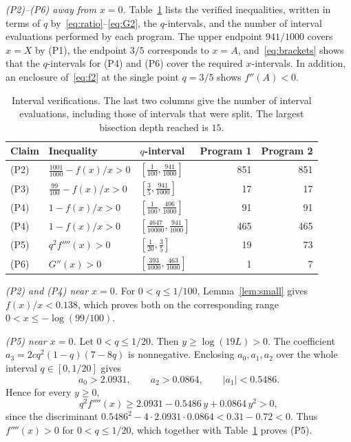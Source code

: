 \documentclass{amsart}
\numberwithin{equation}{section}
\numberwithin{table}{section}
\theoremstyle{definition}
\theoremstyle{remark}
\begin{document}
\emph{(P2)--(P6) away from $x=0$.} Table~\ref{tab:cover} lists the verified inequalities, written in terms of $q$ by~\eqref{eq:ratio}--\eqref{eq:G2}, the $q$-intervals, and the number of interval evaluations performed by each program. The upper endpoint $941/1000$ covers $x=X$ by (P1), the endpoint $3/5$ corresponds to $x=A$, and~\eqref{eq:brackets} shows that the $q$-intervals for (P4) and (P6) cover the required $x$-intervals. In addition, an enclosure of~\eqref{eq:f2} at the single point $q=3/5$ shows $f''(A)<0$.

\begin{table}[ht]
\caption{Interval verifications. The last two columns give the number of interval evaluations, including those of intervals that were split. The largest bisection depth reached is $15$.}
\label{tab:cover}
\centering
\begin{tabular}{@{}lllrr@{}}
\toprule
Claim & Inequality & $q$-interval & Program 1 & Program 2\\
\midrule
(P2) & $\frac{1001}{1000}-f(x)/x>0$ & $[\frac1{100},\frac{941}{1000}]$ & 851 & 851\\[2pt]
(P3) & $\frac{99}{100}-f(x)/x>0$ & $[\frac35,\frac{941}{1000}]$ & 17 & 17\\[2pt]
(P4) & $1-f(x)/x>0$ & $[\frac1{100},\frac{406}{1000}]$ & 91 & 91\\[2pt]
(P4) & $1-f(x)/x>0$ & $[\frac{4647}{10000},\frac{941}{1000}]$ & 465 & 465\\[2pt]
(P5) & $q^2f''''(x)>0$ & $[\frac1{20},\frac35]$ & 19 & 73\\[2pt]
(P6) & $G''(x)>0$ & $[\frac{393}{1000},\frac{463}{1000}]$ & 1 & 7\\
\bottomrule
\end{tabular}
\end{table}

\emph{(P2) and (P4) near $x=0$.} For $0<q\le1/100$, Lemma~\ref{lem:small} gives $f(x)/x<0.138$, which proves both on the corresponding range $0<x\le-\log(99/100)$.

\emph{(P5) near $x=0$.} Let $0<q\le1/20$. Then $y\ge\log(19L)>0$. The coefficient $a_3=2cq^2(1-q)(7-8q)$ is nonnegative. Enclosing $a_0,a_1,a_2$ over the whole interval $q\in[0,1/20]$ gives
\[
a_0>2.0931,\qquad a_2>0.0864,\qquad |a_1|<0.5486 .
\]
Hence for every $y\ge0$,
\[
q^2f''''(x)\ge2.0931-0.5486\,y+0.0864\,y^2>0,
\]
since the discriminant $0.5486^2-4\cdot2.0931\cdot0.0864<0.31-0.72<0$. Thus $f''''(x)>0$ for $0<q\le1/20$, which together with Table~\ref{tab:cover} proves (P5).
\end{document}
